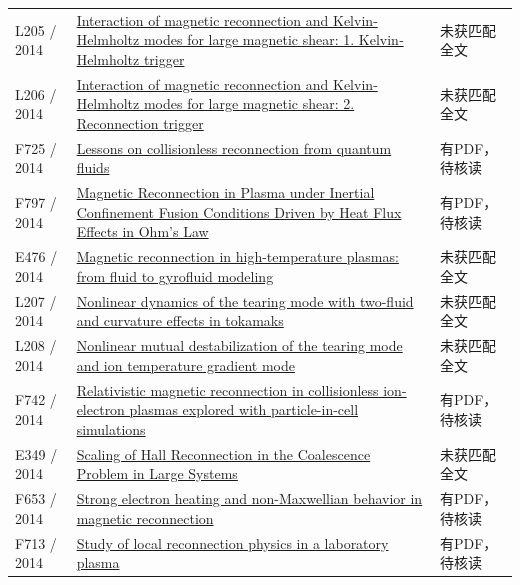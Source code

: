 \begin{longtable}{P{24mm}P{97mm}P{27mm}}
L205 / 2014 & \href{https://doi.org/10.1002/2013ja019224}{Interaction of magnetic reconnection and Kelvin‐Helmholtz modes for large magnetic shear: 1. Kelvin‐Helmholtz trigger} & 未获匹配全文\\

L206 / 2014 & \href{https://doi.org/10.1002/2013ja019225}{Interaction of magnetic reconnection and Kelvin‐Helmholtz modes for large magnetic shear: 2. Reconnection trigger} & 未获匹配全文\\

F725 / 2014 & \href{https://doi.org/10.3389/fphy.2014.00076}{Lessons on collisionless reconnection from quantum fluids} & 有PDF，待核读\\

F797 / 2014 & \href{https://doi.org/10.1103/physrevlett.112.105004}{Magnetic Reconnection in Plasma under Inertial Confinement Fusion Conditions Driven by Heat Flux Effects in Ohm’s Law} & 有PDF，待核读\\

E476 / 2014 & \href{http://hdl.handle.net/11583/2536090}{Magnetic reconnection in high-temperature plasmas: from fluid to gyrofluid modeling} & 未获匹配全文\\

L207 / 2014 & \href{https://doi.org/10.1063/1.4863498}{Nonlinear dynamics of the tearing mode with two-fluid and curvature effects in tokamaks} & 未获匹配全文\\

L208 / 2014 & \href{https://doi.org/10.1088/0029-5515/54/12/123018}{Nonlinear mutual destabilization of the tearing mode and ion temperature gradient mode} & 未获匹配全文\\

F742 / 2014 & \href{https://doi.org/10.1051/0004-6361/201424083}{Relativistic magnetic reconnection in collisionless ion-electron plasmas explored with particle-in-cell simulations} & 有PDF，待核读\\

E349 / 2014 & \href{http://absimage.aps.org/image/DPP14/MWS_DPP14-2014-001290.pdf}{Scaling of Hall Reconnection in the Coalescence Problem in Large Systems} & 未获匹配全文\\

F653 / 2014 & \href{https://doi.org/10.1186/bf03353282}{Strong electron heating and non-Maxwellian behavior in magnetic reconnection} & 有PDF，待核读\\

F713 / 2014 & \href{https://doi.org/10.1186/bf03353267}{Study of local reconnection physics in a laboratory plasma} & 有PDF，待核读\\


\end{longtable}
